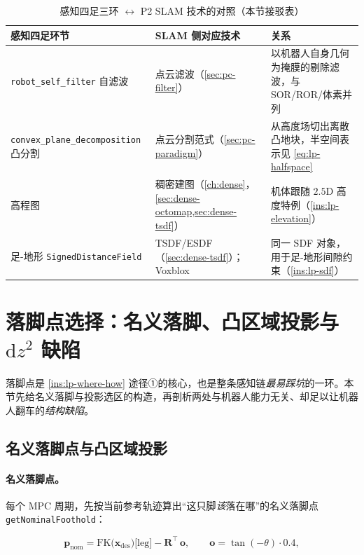 \begin{table}[H]\centering\small
\caption{感知四足三环 $\leftrightarrow$ P2 SLAM 技术的对照（本节接驳表）}
\begin{tabular}{p{} p{} p{}}
\toprule
感知四足环节 & SLAM 侧对应技术 & 关系 \\
\midrule
\texttt{robot\_self\_filter} 自滤波 & 点云滤波（\cref{sec:pc-filter}）& 以机器人自身几何为掩膜的剔除滤波，与 SOR/ROR/体素并列 \\
\texttt{convex\_plane\_decomposition} 凸分割 & 点云分割范式（\cref{sec:pc-paradigm}）& 从高度场切出离散凸地块，半空间表示见 \cref{eq:lp-halfspace} \\
高程图 & 稠密建图（\cref{ch:dense}，\cref{sec:dense-octomap,sec:dense-tsdf}）& 机体跟随 $2.5$D 高度特例（\cref{ins:lp-elevation}）\\
足-地形 \texttt{SignedDistanceField} & TSDF/ESDF（\cref{sec:dense-tsdf}）；Voxblox\cite{oleynikova2017voxblox} & 同一 SDF 对象，用于足-地形间隙约束（\cref{ins:lp-sdf}）\\
\bottomrule
\end{tabular}
\label{tab:lp-slam}
\end{table}

\section{落脚点选择：名义落脚、凸区域投影与 \texorpdfstring{$\mathrm{d}z^2$}{dz2} 缺陷}
\label{sec:lp-foothold}

落脚点是 \cref{ins:lp-where-how} 途径①的核心，也是整条感知链\emph{最易踩坑}的一环。本节先给名义落脚与投影选区的构造，再剖析两处与机器人能力无关、却足以让机器人翻车的\emph{结构缺陷}。

\subsection{名义落脚点与凸区域投影}
\label{subsec:lp-nominal}

\paragraph{名义落脚点。}
每个 MPC 周期，先按当前参考轨迹算出“这只脚\emph{该}落在哪”的名义落脚点 \texttt{getNominalFoothold}：

\begin{equation}
  \mathbf{p}_{\mathrm{nom}} = \mathrm{FK}\big(\mathbf{x}_{\mathrm{des}}\big)\big[\text{leg}\big] - \mathbf{R}^\top\,\mathbf{o},
  \qquad
  \mathbf{o} = \tan(-\theta)\cdot 0.4,
  \label{eq:lp-nominal}
\end{equation}

